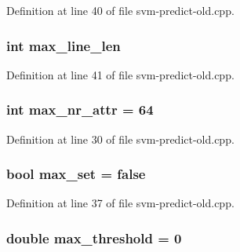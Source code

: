Definition at line 40 of file svm-\/predict-\/old.\-cpp.

\hypertarget{svm-predict-old_8cpp_acad24c15bee67d2026f56bc94a1188c7}{
\subsubsection[{max\-\_\-line\-\_\-len}]{\setlength{\rightskip}{0pt plus 5cm}int max\-\_\-line\-\_\-len\hspace{0.3cm}{\ttfamily [static]}}}\label{svm-predict-old_8cpp_acad24c15bee67d2026f56bc94a1188c7}


Definition at line 41 of file svm-\/predict-\/old.\-cpp.

\hypertarget{svm-predict-old_8cpp_af95bde9162db2c5dd97e80795b3548ed}{
\subsubsection[{max\-\_\-nr\-\_\-attr}]{\setlength{\rightskip}{0pt plus 5cm}int max\-\_\-nr\-\_\-attr = 64}}\label{svm-predict-old_8cpp_af95bde9162db2c5dd97e80795b3548ed}


Definition at line 30 of file svm-\/predict-\/old.\-cpp.

\hypertarget{svm-predict-old_8cpp_acd0f485f4131af58e0bdb273316d3805}{
\subsubsection[{max\-\_\-set}]{\setlength{\rightskip}{0pt plus 5cm}bool max\-\_\-set = false}}\label{svm-predict-old_8cpp_acd0f485f4131af58e0bdb273316d3805}


Definition at line 37 of file svm-\/predict-\/old.\-cpp.

\hypertarget{svm-predict-old_8cpp_a9090dc0b930a5f9212a3b6f3e4b5c5ab}{
\subsubsection[{max\-\_\-threshold}]{\setlength{\rightskip}{0pt plus 5cm}double max\-\_\-threshold = 0}}\label{svm-predict-old_8cpp_a9090dc0b930a5f9212a3b6f3e4b5c5ab}


